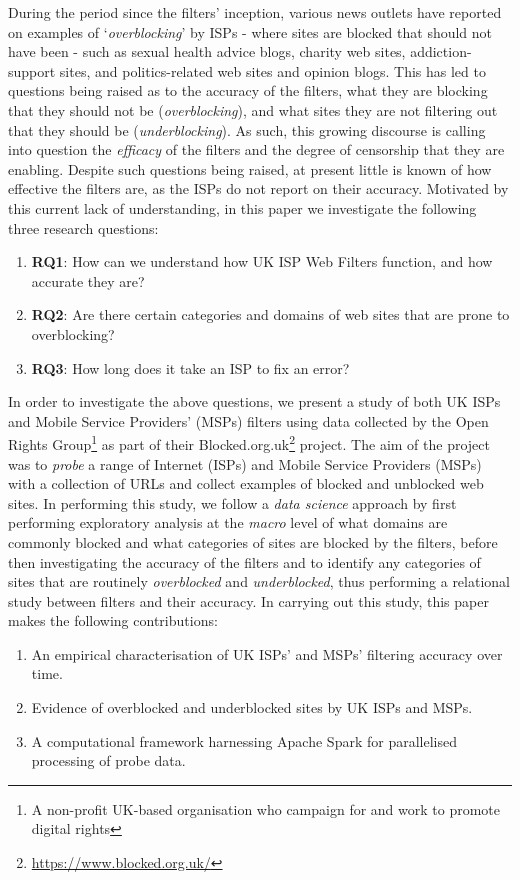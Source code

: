 \documentclass{bmcart}
\begin{document}
During the period since the filters' inception, various news outlets have reported on examples of `\textit{overblocking}' by ISPs - where sites are blocked that should not have been - such as sexual health advice blogs, charity web sites, addiction-support sites, and politics-related web sites and opinion blogs.
This has led to questions being raised as to the accuracy of the filters, what they are blocking that they should not be (\textit{overblocking}), and what sites they are not filtering out that they should be (\textit{underblocking}).
As such, this growing discourse is  calling into question the \textit{efficacy} of the filters and the degree of censorship that they are enabling.
Despite such questions being raised, at present little is known of how effective the filters are, as the ISPs do not report on their accuracy.
Motivated by this current lack of understanding, in this paper we investigate the following three research questions:

\begin{enumerate}
	\item \textbf{RQ1}: How can we understand how UK ISP Web Filters function, and how accurate they are?
	\item \textbf{RQ2}: Are there certain categories and domains of web sites that are prone to overblocking?
	\item \textbf{RQ3}: How long does it take an ISP to fix an error?
\end{enumerate}

In order to investigate the above questions, we present a study of both UK ISPs and Mobile Service Providers' (MSPs) filters using data collected by the Open Rights Group\footnote{A non-profit UK-based organisation who campaign for and work to promote digital rights} as part of their Blocked.org.uk\footnote{\url{https://www.blocked.org.uk/}} project.
The aim of the project was to \textit{probe} a range of Internet (ISPs) and Mobile Service Providers (MSPs) with a collection of URLs and collect examples of blocked and unblocked web sites.
In performing this study, we follow a \textit{data science} approach by first performing exploratory analysis at the \textit{macro} level of what domains are commonly blocked and what categories of sites are blocked by the filters, before then investigating the accuracy of the filters and to identify any categories of sites that are routinely \textit{overblocked} and \textit{underblocked}, thus performing a relational study between filters and their accuracy.
In carrying out this study, this paper makes the following contributions:
\begin{enumerate}
	\item An empirical characterisation of UK ISPs' and MSPs' filtering accuracy over time.
	\item Evidence of overblocked and underblocked sites by UK ISPs and MSPs.
	\item A computational framework harnessing Apache Spark for parallelised processing of probe data.
\end{enumerate}
\end{document}
